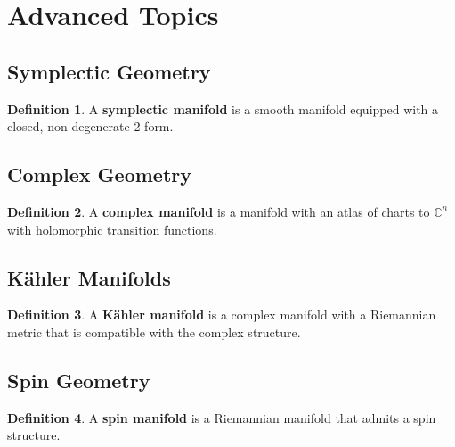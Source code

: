 \documentclass[11pt]{article}
\theoremstyle{definition}
\newtheorem{definition}{Definition}[section]
\begin{document}
\section{Advanced Topics}

\subsection{Symplectic Geometry}
\begin{definition}
A \textbf{symplectic manifold} is a smooth manifold equipped with a closed, non-degenerate 2-form.
\end{definition}

\subsection{Complex Geometry}
\begin{definition}
A \textbf{complex manifold} is a manifold with an atlas of charts to $\mathbb{C}^n$ with holomorphic transition functions.
\end{definition}

\subsection{Kähler Manifolds}
\begin{definition}
A \textbf{Kähler manifold} is a complex manifold with a Riemannian metric that is compatible with the complex structure.
\end{definition}

\subsection{Spin Geometry}
\begin{definition}
A \textbf{spin manifold} is a Riemannian manifold that admits a spin structure.
\end{definition}
\end{document}
